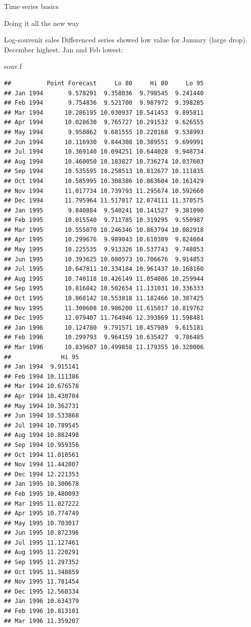 \documentclass[ignorenonframetext,]{beamer}
\newenvironment{Shaded}{\begin{snugshade}}{\end{snugshade}}
\newcommand{\NormalTok}[1]{#1}
\begin{document}
\begin{frame}[fragile]{Time series basics}
\begin{block}{Doing it all the new way}
\begin{block}{Log-souvenir sales}
Differenced series showed low value for January (large drop). December
highest, Jan and Feb lowest:

\begin{Shaded}
\begin{Highlighting}[]
\NormalTok{souv.f}
\end{Highlighting}
\end{Shaded}

\begin{verbatim}
##          Point Forecast     Lo 80     Hi 80     Lo 95
## Jan 1994       9.578291  9.358036  9.798545  9.241440
## Feb 1994       9.754836  9.521700  9.987972  9.398285
## Mar 1994      10.286195 10.030937 10.541453  9.895811
## Apr 1994      10.028630  9.765727 10.291532  9.626555
## May 1994       9.950862  9.681555 10.220168  9.538993
## Jun 1994      10.116930  9.844308 10.389551  9.699991
## Jul 1994      10.369140 10.094251 10.644028  9.948734
## Aug 1994      10.460050 10.183827 10.736274 10.037603
## Sep 1994      10.535595 10.258513 10.812677 10.111835
## Oct 1994      10.585995 10.308386 10.863604 10.161429
## Nov 1994      11.017734 10.739793 11.295674 10.592660
## Dec 1994      11.795964 11.517817 12.074111 11.370575
## Jan 1995       9.840884  9.540241 10.141527  9.381090
## Feb 1995      10.015540  9.711785 10.319295  9.550987
## Mar 1995      10.555070 10.246346 10.863794 10.082918
## Apr 1995      10.299676  9.989043 10.610309  9.824604
## May 1995      10.225535  9.913326 10.537743  9.748053
## Jun 1995      10.393625 10.080573 10.706676  9.914853
## Jul 1995      10.647811 10.334184 10.961437 10.168160
## Aug 1995      10.740118 10.426149 11.054086 10.259944
## Sep 1995      10.816842 10.502654 11.131031 10.336333
## Oct 1995      10.868142 10.553818 11.182466 10.387425
## Nov 1995      11.300608 10.986200 11.615017 10.819762
## Dec 1995      12.079407 11.764946 12.393869 11.598481
## Jan 1996      10.124780  9.791571 10.457989  9.615181
## Feb 1996      10.299793  9.964159 10.635427  9.786485
## Mar 1996      10.839607 10.499858 11.179355 10.320006
##              Hi 95
## Jan 1994  9.915141
## Feb 1994 10.111386
## Mar 1994 10.676578
## Apr 1994 10.430704
## May 1994 10.362731
## Jun 1994 10.533868
## Jul 1994 10.789545
## Aug 1994 10.882498
## Sep 1994 10.959356
## Oct 1994 11.010561
## Nov 1994 11.442807
## Dec 1994 12.221353
## Jan 1995 10.300678
## Feb 1995 10.480093
## Mar 1995 11.027222
## Apr 1995 10.774749
## May 1995 10.703017
## Jun 1995 10.872396
## Jul 1995 11.127461
## Aug 1995 11.220291
## Sep 1995 11.297352
## Oct 1995 11.348859
## Nov 1995 11.781454
## Dec 1995 12.560334
## Jan 1996 10.634379
## Feb 1996 10.813101
## Mar 1996 11.359207
\end{verbatim}


\end{block}
\end{block}
\end{frame}
\end{document}
